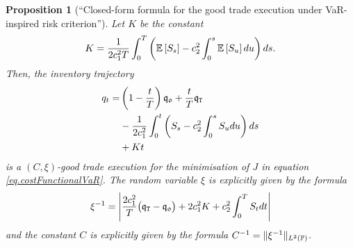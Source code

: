\documentclass[10pt,a4paper]{article}
\newtheorem{prop}[thm]{Proposition}
\begin{document}
	\begin{prop}[``Closed-form formula for the good trade execution under VaR-inspired risk criterion'']\label{prop.goodTradeExecutionVaR}
		Let $K$ be the constant 
		\begin{equation*}
		K=\frac{1}{2c_{1}^{2} T}\int_{0}^{T} 
		\left(
		\mathbb{{E}}\left[S_s\right] - c_{2}^{2} \int_{0}^{s}\mathbb{{E}}\left[S_u\right]du 
		 \right) ds.
		\end{equation*}
		Then, the inventory trajectory 
		\begin{equation}\label{eq.goodExecutionVaR}
		\begin{split}
		q_t =& \left(1-\frac{t}{T}\right)\mathfrak{q_0} + \frac{t}{T}\mathfrak{q}_{\mathtt{T} } \\
		& - \frac{1}{2c_{1}^{2}}\int_{0}^{t} 
		\left(
		S_s - c_{2}^{2} \int_{0}^{s}S_u du 
		\right) ds\\
		& +Kt
		\end{split}
		\end{equation}
		is a $(C,\xi)$-good trade execution for the minimisation of $J$ in equation \eqref{eq.costFunctionalVaR}. The random variable $\xi$ is explicitly given by the formula  
		\begin{equation*}
		\xi^{-1}  = \left\lvert
		\frac{2c_{1}^{2}}{T} \big(\mathfrak{q}_{\mathtt{T} } - \mathfrak{q_0} \big)
		+2c_{1}^{2} K 
		+c_{2}^{2} \int_{0}^{T} S_t dt 
		\right\rvert
		\end{equation*}
		and the constant $C$ is explicitly given by the formula $C^{-1}=\lVert \xi^{-1} \rVert_{L^{2}({\mathbb{P}})}$. 
	\end{prop}
\end{document}
